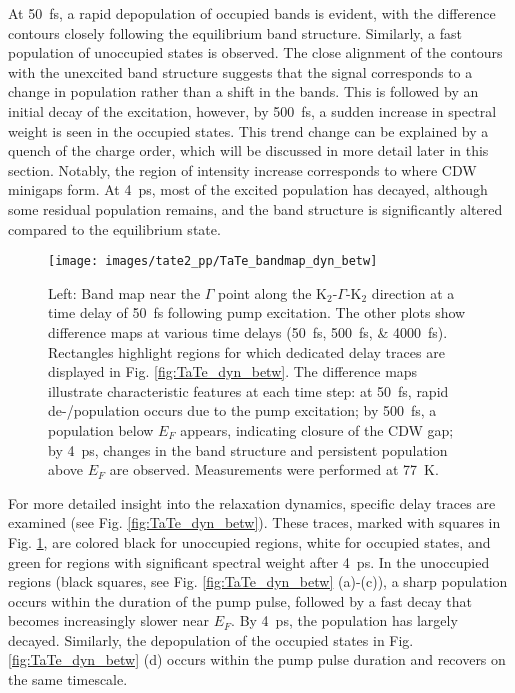 At \qty{50}{\femto\second}, a rapid depopulation of occupied bands is evident, with the difference contours closely following the equilibrium band structure.
Similarly, a fast population of unoccupied states is observed.
The close alignment of the contours with the unexcited band structure suggests that the signal corresponds to a change in population rather than a shift in the bands.
This is followed by an initial decay of the excitation, however, by \qty{500}{\femto\second}, a sudden increase in spectral weight is seen in the occupied states.
This trend change can be explained by a quench of the charge order, which will be discussed in more detail later in this section.
Notably, the region of intensity increase corresponds to where CDW minigaps form.
At \qty{4}{\pico\second}, most of the excited population has decayed, although some residual population remains, and the band structure is significantly altered compared to the equilibrium state.

\begin{figure}[t!]
	\centering
	\texttt{[image: images/tate2\_pp/TaTe\_bandmap\_dyn\_betw]}
	\caption{Left: Band map near the $\Gamma$ point along the K$_2$-$\Gamma$-K$_2$ direction at a time delay of \qty{50}{\femto\second} following pump excitation. The other plots show difference maps at various time delays (\qtylist{50;500;4000}{\femto\second}). Rectangles highlight regions for which dedicated delay traces are displayed in Fig. \ref{fig:TaTe_dyn_betw}. The difference maps illustrate characteristic features at each time step: at \qty{50}{\femto\second}, rapid de-/population occurs due to the pump excitation; by \qty{500}{\femto\second}, a population below $E_F$ appears, indicating closure of the CDW gap; by \qty{4}{\pico\second}, changes in the band structure and persistent population above $E_F$ are observed. Measurements were performed at \qty{77}{\kelvin}.}
	\label{fig:TaTe_bandmap_dyn_betw}
\end{figure}

For more detailed insight into the relaxation dynamics, specific delay traces are examined (see Fig. \ref{fig:TaTe_dyn_betw}).
These traces, marked with squares in Fig. \ref{fig:TaTe_bandmap_dyn_betw}, are colored black for unoccupied regions, white for occupied states, and green for regions with significant spectral weight after \qty{4}{\pico\second}.
In the unoccupied regions (black squares, see Fig. \ref{fig:TaTe_dyn_betw} (a)-(c)), a sharp population occurs within the duration of the pump pulse, followed by a fast decay that becomes increasingly slower near $E_F$.
By \qty{4}{\pico\second}, the population has largely decayed.
Similarly, the depopulation of the occupied states in Fig. \ref{fig:TaTe_dyn_betw} (d) occurs within the pump pulse duration and recovers on the same timescale.

